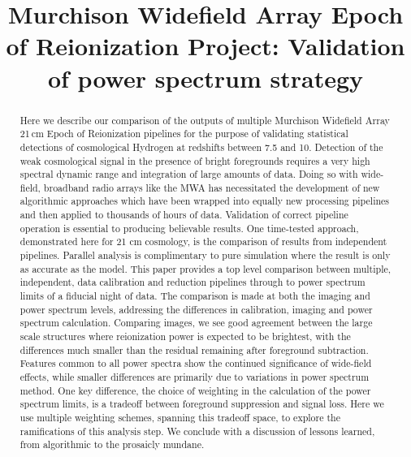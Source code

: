 \documentclass[twolcolumn,iop]{emulateapj}
\begin{document}

\title{Murchison Widefield Array Epoch of Reionization Project: Validation of power spectrum strategy}






\begin{abstract}
Here we describe our comparison of the outputs of multiple Murchison Widefield Array 21\,cm Epoch of Reionization pipelines for the purpose of validating statistical detections of cosmological Hydrogen at redshifts between 7.5 and 10. Detection of the weak cosmological signal in the presence of bright foregrounds requires a very high spectral dynamic range and integration of large amounts of data. Doing so with wide-field, broadband radio arrays like the MWA has necessitated the development of new algorithmic approaches which have been wrapped into equally new processing pipelines and then applied to thousands of hours of data. Validation of  correct pipeline operation is essential to producing believable results. One time-tested approach, demonstrated here for 21 cm cosmology, is the comparison of results from independent pipelines. Parallel analysis is complimentary to pure simulation where the result is only as accurate as the model.  This paper provides a top level comparison between multiple, independent, data calibration and reduction pipelines through to power spectrum limits of a fiducial night of data.  The comparison is made at both the imaging and power spectrum levels, addressing the differences in calibration, imaging and power spectrum calculation. Comparing images, we see good agreement between the large scale structures where reionization power is expected to be brightest, with the differences much smaller than the residual remaining after foreground subtraction. Features common to all power spectra show the continued significance of wide-field effects, while smaller differences are primarily due to variations in power spectrum method. One key difference, the choice of weighting in the calculation of the power spectrum limits, is a tradeoff between foreground suppression and signal loss. Here we use multiple weighting schemes, spanning this tradeoff space, to explore the ramifications of this analysis step. We conclude with a discussion of lessons learned, from algorithmic to the prosaicly mundane.

\end{abstract}
\end{document}
